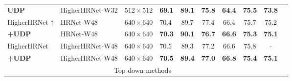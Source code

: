 \documentclass[10pt,journal,compsoc]{IEEEtran}
\begin{document}
\begin{table*}
\begin{center}
\begin{tabular}{l|l|c|lcccccc}
\textbf{UDP}                     &HigherHRNet-W32&$512\times512$    &\textbf{69.1}         & \textbf{89.1}     & \textbf{75.8}  & \textbf{64.4} &\textbf{75.5}  &\textbf{73.8}\\
HigherHRNet \cite{Higher}$\dagger$&HRNet-W48     &$640\times640$    &70.4                  & 89.7              & 77.4           & 66.4          &75.7           &75.2\\
\textbf{+UDP}                    &HRNet-W48      &$640\times640$    &\textbf{70.3}         & \textbf{90.1}     & \textbf{76.7}  & \textbf{66.6} &\textbf{75.3}  &\textbf{75.1}\\
HigherHRNet \cite{Higher}        &HigherHRNet-W48&$640\times640$    &70.5                  & 89.3              & 77.2           & 66.6          &75.8           &-\\
\textbf{+UDP}                    &HigherHRNet-W48&$640\times640$    &\textbf{70.5}         & \textbf{89.4}     & \textbf{77.0}  & \textbf{66.8} &\textbf{75.4}  &\textbf{75.1}\\
\hline
\multicolumn{9}{c}{Top-down methods}\\


\end{tabular}
\end{center}
\end{table*}
\end{document}
